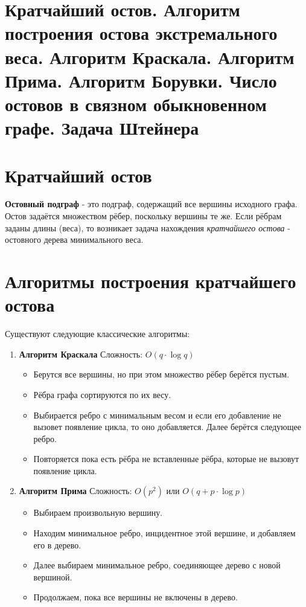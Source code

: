{
	\section{Кратчайший остов. Алгоритм построения остова экстремального веса. Алгоритм
Краскала. Алгоритм Прима. Алгоритм Борувки. Число остовов в связном
обыкновенном графе. Задача Штейнера}

\section*{Кратчайший остов}

\textbf{Остовный подграф} - это подграф, содержащий все вершины исходного графа.  
Остов задаётся множеством рёбер, поскольку вершины те же.  
Если рёбрам заданы длины (веса), то возникает задача нахождения \emph{кратчайшего остова} - остовного дерева минимального веса.

\section*{Алгоритмы построения кратчайшего остова}

Существуют следующие классические алгоритмы:

\begin{enumerate}
  \item \textbf{Алгоритм Краскала}  
  Сложность: $O(q \cdot \log q)$
  \begin{itemize}
    \item Берутся все вершины, но при этом множество рёбер берётся пустым.
    \item Рёбра графа сортируются по их весу.
    \item Выбирается ребро с минимальным весом и если его добавление не
вызовет появление цикла, то оно добавляется. Далее берётся
следующее ребро.
    \item  Повторяется пока есть рёбра не вставленные рёбра,
которые не вызовут появление цикла.
  \end{itemize}

  \item \textbf{Алгоритм Прима}  
  Сложность: $O(p^2)$ или $O(q + p \cdot \log p)$
  \begin{itemize}
    \item Выбираем произвольную вершину.
    \item Находим минимальное ребро, инцидентное этой вершине, и добавляем его в дерево.
    \item Далее выбираем минимальное ребро, соединяющее дерево с новой вершиной.
    \item Продолжаем, пока все вершины не включены в дерево.
  \end{itemize}


\end{enumerate}}

